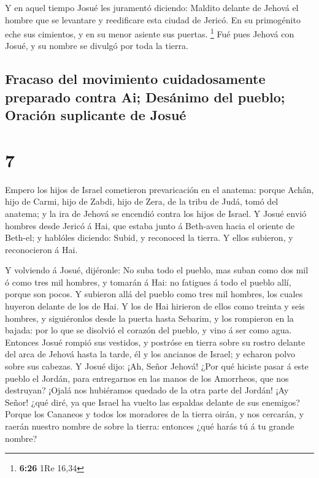  Y en aquel tiempo Josué les juramentó diciendo: Maldito
delante de Jehová el hombre que se levantare y reedificare esta ciudad
de Jericó. En su primogénito eche sus cimientos, y en su menor asiente
sus puertas. \footnote{\textbf{6:26} 1Re 16,34}  Fué pues
Jehová con Josué, y su nombre se divulgó por toda la tierra.

\hypertarget{fracaso-del-movimiento-cuidadosamente-preparado-contra-ai-desuxe1nimo-del-pueblo-oraciuxf3n-suplicante-de-josuuxe9}{%
\subsection{Fracaso del movimiento cuidadosamente preparado contra Ai;
Desánimo del pueblo; Oración suplicante de
Josué}\label{fracaso-del-movimiento-cuidadosamente-preparado-contra-ai-desuxe1nimo-del-pueblo-oraciuxf3n-suplicante-de-josuuxe9}}

\hypertarget{section-6}{%
\section{7}\label{section-6}}

 Empero los hijos de Israel cometieron prevaricación en el
anatema: porque Achân, hijo de Carmi, hijo de Zabdi, hijo de Zera, de la
tribu de Judá, tomó del anatema; y la ira de Jehová se encendió contra
los hijos de Israel.  Y Josué envió hombres desde Jericó á
Hai, que estaba junto á Beth-aven hacia el oriente de Beth-el; y
hablóles diciendo: Subid, y reconoced la tierra. Y ellos subieron, y
reconocieron á Hai.

 Y volviendo á Josué, dijéronle: No suba todo el pueblo, mas
suban como dos mil ó como tres mil hombres, y tomarán á Hai: no fatigues
á todo el pueblo allí, porque son pocos.  Y subieron allá
del pueblo como tres mil hombres, los cuales huyeron delante de los de
Hai.  Y los de Hai hirieron de ellos como treinta y seis
hombres, y siguiéronlos desde la puerta hasta Sebarim, y los rompieron
en la bajada: por lo que se disolvió el corazón del pueblo, y vino á ser
como agua.  Entonces Josué rompió sus vestidos, y postróse
en tierra sobre su rostro delante del arca de Jehová hasta la tarde, él
y los ancianos de Israel; y echaron polvo sobre sus cabezas.
 Y Josué dijo: ¡Ah, Señor Jehová! ¿Por qué hiciste pasar á
este pueblo el Jordán, para entregarnos en las manos de los Amorrheos,
que nos destruyan? ¡Ojalá nos hubiéramos quedado de la otra parte del
Jordán!  ¡Ay Señor! ¿qué diré, ya que Israel ha vuelto las
espaldas delante de sus enemigos?  Porque los Cananeos y
todos los moradores de la tierra oirán, y nos cercarán, y raerán nuestro
nombre de sobre la tierra: entonces ¿qué harás tú á tu grande nombre?

